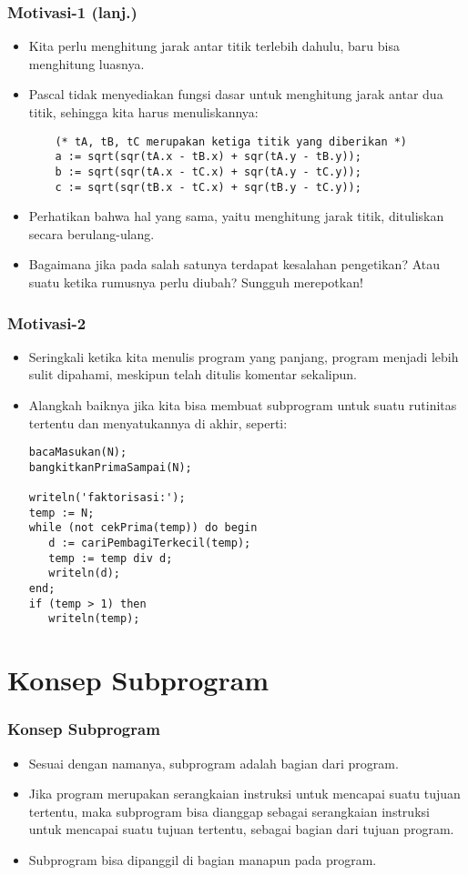 \documentclass{beamer}
\begin{document}
\begin{frame}[fragile]
\frametitle{Motivasi-1 (lanj.)}
\begin{itemize}
	\item Kita perlu menghitung jarak antar titik terlebih dahulu, baru bisa menghitung luasnya.
	\item Pascal tidak menyediakan fungsi dasar untuk menghitung jarak antar dua titik, sehingga kita harus menuliskannya:
	\begin{lstlisting}
	(* tA, tB, tC merupakan ketiga titik yang diberikan *)
	a := sqrt(sqr(tA.x - tB.x) + sqr(tA.y - tB.y));
	b := sqrt(sqr(tA.x - tC.x) + sqr(tA.y - tC.y));
	c := sqrt(sqr(tB.x - tC.x) + sqr(tB.y - tC.y));
	\end{lstlisting}
	\item Perhatikan bahwa hal yang sama, yaitu menghitung jarak titik, dituliskan secara berulang-ulang.
	\item Bagaimana jika pada salah satunya terdapat kesalahan pengetikan? Atau suatu ketika rumusnya perlu diubah? Sungguh merepotkan!
\end{itemize}
\end{frame}

\begin{frame}[fragile]
\frametitle{Motivasi-2}
\begin{itemize}
	\item Seringkali ketika kita menulis program yang panjang, program menjadi lebih sulit dipahami, meskipun telah ditulis komentar sekalipun.
	\item Alangkah baiknya jika kita bisa membuat subprogram untuk suatu rutinitas tertentu dan menyatukannya di akhir, seperti:
	\begin{lstlisting}
bacaMasukan(N);
bangkitkanPrimaSampai(N);

writeln('faktorisasi:');
temp := N;
while (not cekPrima(temp)) do begin
   d := cariPembagiTerkecil(temp);
   temp := temp div d;
   writeln(d);
end;
if (temp > 1) then
   writeln(temp);
	\end{lstlisting}
\end{itemize}
\end{frame}

\section{Konsep Subprogram}
\frame{\sectionpage}

\begin{frame}
\frametitle{Konsep Subprogram}
\begin{itemize}
	\item Sesuai dengan namanya, subprogram adalah bagian dari program.
	\item Jika program merupakan serangkaian instruksi untuk mencapai suatu tujuan tertentu, maka subprogram bisa dianggap sebagai serangkaian instruksi untuk mencapai suatu tujuan tertentu, \alert{sebagai bagian dari tujuan program}.
	\item Subprogram bisa dipanggil di bagian manapun pada program.
\end{itemize}
\end{frame}
\end{document}
